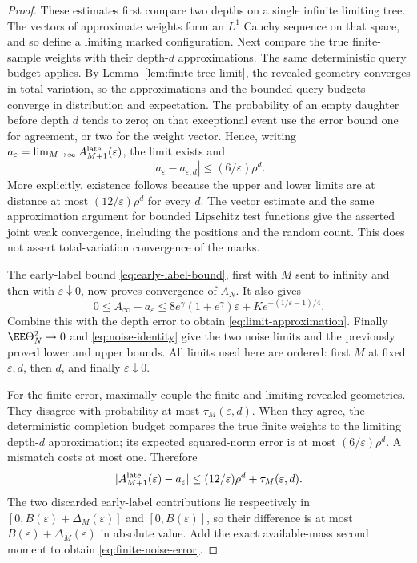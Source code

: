 \documentclass[11pt,letterpaper]{article}
\begin{document}
\begin{proof}
These estimates first compare two depths on a single infinite limiting
tree. The vectors of approximate weights form an $L^1$ Cauchy sequence
on that space, and so define a limiting marked configuration. Next
compare the true finite-sample weights with their depth-$d$ approximations.
The same deterministic query budget applies. By
Lemma~\ref{lem:finite-tree-limit}, the revealed geometry converges in
total variation, so the approximations and the bounded query budgets
converge in distribution and expectation. The probability of an empty
daughter before depth $d$ tends to zero; on that exceptional event use
the error bound one for agreement, or two for the weight vector.
Hence, writing
$a_\varepsilon=\lim_{M\to\infty}A_{M+1}^{\rm late}(\varepsilon)$,
the limit exists and
\[
 |a_\varepsilon-a_{\varepsilon,d}|
        \le(6/\varepsilon)\rho^d.
\]
More explicitly, existence follows because the upper and lower limits
are at distance at most $(12/\varepsilon)\rho^d$ for every $d$.
The vector estimate and the same approximation argument for bounded
Lipschitz test functions give the asserted joint weak convergence,
including the positions and the random count. This does not assert
total-variation convergence of the marks.

The early-label bound \eqref{eq:early-label-bound}, first with $M$
sent to infinity and then with $\varepsilon\downarrow0$, now proves
convergence of $A_N$. It also gives
\[
 0\le A_\infty-a_\varepsilon
       \le8e^\gamma(1+e^\gamma)\varepsilon
                          +K e^{-(1/\varepsilon-1)/4}.
\]
Combine this with the depth error to obtain
\eqref{eq:limit-approximation}. Finally
$\EE\Theta_N^2\to0$ and \eqref{eq:noise-identity} give the two noise
limits and the previously proved lower and upper bounds.
All limits used here are ordered: first $M$ at fixed $\varepsilon,d$,
then $d$, and finally $\varepsilon\downarrow0$.

For the finite error, maximally couple the finite and limiting revealed
geometries. They disagree with probability at most
$\tau_M(\varepsilon,d)$. When they agree, the deterministic completion
budget compares the true finite weights to the limiting depth-$d$
approximation; its expected squared-norm error is at most
$(6/\varepsilon)\rho^d$. A mismatch costs at most one.
Therefore
\[
 |A_{M+1}^{\rm late}(\varepsilon)-a_\varepsilon|
 \le(12/\varepsilon)\rho^d+\tau_M(\varepsilon,d).
\]
The two discarded early-label contributions lie respectively in
$[0,B(\varepsilon)+\Delta_M(\varepsilon)]$ and $[0,B(\varepsilon)]$,
so their difference is at most $B(\varepsilon)+\Delta_M(\varepsilon)$
in absolute value. Add the exact available-mass second moment to obtain
\eqref{eq:finite-noise-error}.
\end{proof}
\end{document}
